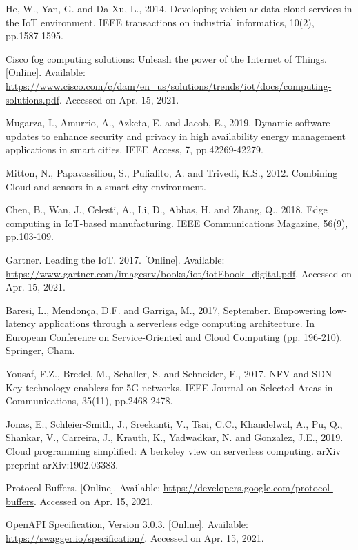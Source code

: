 \documentclass{ieeeaccess}
\begin{document}
\begin{thebibliography}{00}
 He, W., Yan, G. and Da Xu, L., 2014. Developing vehicular data cloud services in the IoT environment. IEEE transactions on industrial informatics, 10(2), pp.1587-1595.

 Cisco fog computing solutions: Unleash the power of the Internet of Things. [Online]. Available: \url{https://www.cisco.com/c/dam/en\_us/solutions/trends/iot/docs/computing-solutions.pdf}. Accessed on Apr. 15, 2021.

 Mugarza, I., Amurrio, A., Azketa, E. and Jacob, E., 2019. Dynamic software updates to enhance security and privacy in high availability energy management applications in smart cities. IEEE Access, 7, pp.42269-42279.

 Mitton, N., Papavassiliou, S., Puliafito, A. and Trivedi, K.S., 2012. Combining Cloud and sensors in a smart city environment.

 Chen, B., Wan, J., Celesti, A., Li, D., Abbas, H. and Zhang, Q., 2018. Edge computing in IoT-based manufacturing. IEEE Communications Magazine, 56(9), pp.103-109.

 Gartner. Leading the IoT. 2017. [Online]. Available: \url{https://www.gartner.com/imagesrv/books/iot/iotEbook_digital.pdf}. Accessed on Apr. 15, 2021.

 Baresi, L., Mendonça, D.F. and Garriga, M., 2017, September. Empowering low-latency applications through a serverless edge computing architecture. In European Conference on Service-Oriented and Cloud Computing (pp. 196-210). Springer, Cham.

 Yousaf, F.Z., Bredel, M., Schaller, S. and Schneider, F., 2017. NFV and SDN—Key technology enablers for 5G networks. IEEE Journal on Selected Areas in Communications, 35(11), pp.2468-2478.

 Jonas, E., Schleier-Smith, J., Sreekanti, V., Tsai, C.C., Khandelwal, A., Pu, Q., Shankar, V., Carreira, J., Krauth, K., Yadwadkar, N. and Gonzalez, J.E., 2019. Cloud programming simplified: A berkeley view on serverless computing. arXiv preprint arXiv:1902.03383.

 Protocol Buffers. [Online]. Available: \url{https://developers.google.com/protocol-buffers}. Accessed on Apr. 15, 2021.

 OpenAPI Specification, Version 3.0.3. [Online]. Available: \url{https://swagger.io/specification/}. Accessed on Apr. 15, 2021.


\end{thebibliography}
\end{document}
